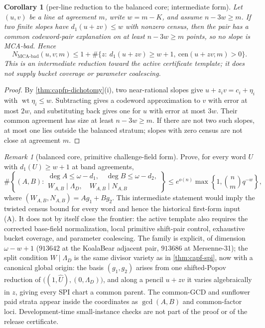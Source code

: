 \documentclass[11pt]{article}
\newtheorem{corollary}[corollary]{Corollary}
\theoremstyle{definition}
\theoremstyle{remark}
\newtheorem{remark}[remark]{Remark}
\begin{document}
\begin{corollary}[per-line reduction to the balanced core; intermediate form]\label{cor:capfp-line}
Let $(u,v)$ be a line at agreement $m$, write $w=m-K$, and assume $n-3w\ge m$.  If two finite slopes have $d_1(u+zv)\le w$ with nonzero census, then the pair has a common codeword-pair explanation on at least $n-3w\ge m$ points, so no slope is MCA-bad.  Hence
\[
        N_{\mathrm{MCA\text{-}bad}}(u,v;m)
        \le 1+\#\{z:\ d_1(u+zv)\ge w+1,\ \mathrm{cen}(u+zv;m)>0\}.
\]
This is an intermediate reduction toward the active certificate template; it does not supply bucket coverage or parameter coalescing.
\end{corollary}

\begin{proof}
By \cref{thm:capfp-dichotomy}(i), two near-rational slopes give $u+z_iv=c_i+\eta_i$ with $\operatorname{wt}\eta_i\le w$.  Subtracting gives a codeword approximation to $v$ with error at most $2w$, and substituting back gives one for $u$ with error at most $3w$.  Their common agreement has size at least $n-3w\ge m$.  If there are not two such slopes, at most one lies outside the balanced stratum; slopes with zero census are not close at agreement $m$.
\end{proof}

\begin{remark}[balanced core, primitive challenge-field form]\label{prob:capfp-balanced}
Prove, for every word $U$ with $d_1(U)\ge w+1$ at band agreements,
\[
        \#\left\{(A,B):
\begin{array}{l}
\deg A\le\omega-d_1,\quad \deg B\le\omega-d_2,\\
W_{A,B}\mid\Lambda_D,\quad W_{A,B}\mid N_{A,B}
\end{array}
\right\}
\le e^{o(n)}\max\left\{1,\binom nm q^{-w}\right\},
\]
where $(W_{A,B},N_{A,B})=Ag_1+Bg_2$.  This intermediate statement would imply the twisted census bound for every word and hence the historical first-form input \textup{(A)}.  It does not by itself close the frontier: the active template also requires the corrected base-field normalization, local primitive shift-pair control, exhaustive bucket coverage, and parameter coalescing.  The family is explicit, of dimension $\omega-w+1$ \textup($913642$ at the KoalaBear adjacent pair, $913686$ at Mersenne-31\textup); the split condition $W\mid\Lambda_D$ is the same divisor variety as in \cref{thm:capf-spi}, now with a canonical global origin: the basis $(g_1,g_2)$ arises from one shifted-Popov reduction of $\bigl((1,\widehat U),(0,\Lambda_D)\bigr)$, and along a pencil $u+zv$ it varies algebraically in $z$, giving every SPI chart a common parent.  The common-GCD and sunflower paid strata appear inside the coordinates as $\gcd(A,B)$ and common-factor loci.  Development-time small-instance checks are not part of the proof or of the release certificate.
\end{remark}
\end{document}
